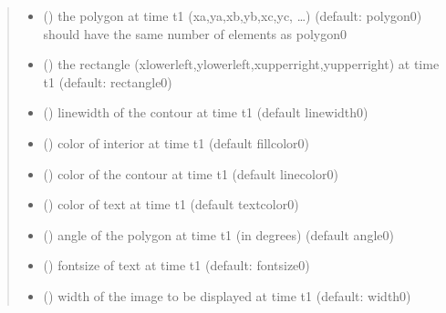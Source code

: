 \documentclass[letterpaper,10pt,english]{sphinxmanual}
\begin{document}
\begin{fulllineitems}
\begin{quote}
\begin{description}
\begin{itemize}
\item {} 
 () \textendash{} the polygon at time t1 (xa,ya,xb,yb,xc,yc, …) (default: polygon0) 
should have the same number of elements as polygon0

\item {} 
 () \textendash{} the rectangle (xlowerleft,ylowerleft,xupperright,yupperright) at time t1
(default: rectangle0)

\item {} 
 () \textendash{} linewidth of the contour at time t1 (default linewidth0)

\item {} 
 () \textendash{} color of interior at time t1 (default fillcolor0)

\item {} 
 () \textendash{} color of the contour at time t1 (default linecolor0)

\item {} 
 () \textendash{} color of text at time t1 (default textcolor0)

\item {} 
 () \textendash{} angle of the polygon at time t1 (in degrees) (default angle0)

\item {} 
 () \textendash{} fontsize of text at time t1 (default: fontsize0)

\item {} 
 () \textendash{} width of the image to be displayed at time t1 (default: width0) 

\end{itemize}


\end{description}
\end{quote}
\end{fulllineitems}
\end{document}
